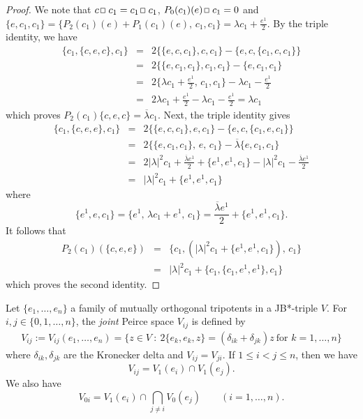\documentclass[12pt, twoside]{article}
\def\sqr#1#2{{\,\vcenter{\vbox{\hrule height.#2pt\hbox{\vrule width.#2pt
height#1pt \kern#1pt\vrule width.#2pt}\hrule height.#2pt}}\,}}
\def\bo{\sqr44\,}
\theoremstyle{definition}
\numberwithin{equation}{section}
\begin{document}
\begin{proof}
We note that $c\bo c_1 =  c_1\bo c_1$, $P_0(c_1)(e) \bo c_1 =0$  and
$\{e,c_1,c_1\}=\{ P_2(c_1)(e) + P_1(c_1)(e),\, c_1,c_1\} = \lambda c_1 + \frac{e^1}{2}$.
 By the triple identity, we have
\begin{eqnarray*}
\{c_1, \{c,e,c\}, c_1\}&=& 2\{\{e,c,c_1\}, c,c_1\} - \{e,c, \{c_1,c, c_1\}\}\\
&=& 2 \{\{e,c_1,c_1\}, c_1,c_1\} -  \{e,c_1,c_1\}\\
&=& 2\{ \lambda c_1 + \frac{e^1}{2},\,  c_1,c_1\} -  \lambda c_1 - \frac{ e^1}{2}\\
&=&  2 \lambda c_1 + \frac{ e^1}{2}-  \lambda c_1 - \frac{ e^1}{2} = \lambda c_1
\end{eqnarray*}
which proves $P_2(c_1)\{c,e,c\} = \overline\lambda  c_1$.
Next, the triple identity gives
\begin{eqnarray*}
\{c_1, \{c,e,e\}, c_1\}&=& 2\{\{e,c,c_1\}, e,c_1\} - \{e,c, \{c_1,e, c_1\}\}\\
&=&  2 \{\{e,c_1,c_1\},\, e, \,c_1\} -  \overline \lambda \{e, c_1, c_1\}\\
&=& 2 |\lambda|^2c_1 + \frac{\overline\lambda e^1}{2} + \{e^1,e^1,c_1\}
 -  |\lambda|^2 c_1 -\frac{ \overline\lambda e^1}{2}\\
&=& |\lambda|^2c_1 +  \{e^1,e^1,c_1\}
\end{eqnarray*}
where
$$\{e^1,e,c_1\}= \{e^1,\, \lambda c_1 + e^1,\, c_1\}= \frac{\overline\lambda e^1}{2} + \{e^1,e^1,c_1\}.$$
It follows  that
\begin{eqnarray*}
P_2(c_1)( \{c, e,e\}) &=& \{c_1, (  |\lambda|^2c_1 +  \{e^1,e^1,c_1\} ),\, c_1\}\\
&=&  |\lambda|^2  c_1 +  \{c_1,\{c_1, e^1,e^1\}, c_1\}
\end{eqnarray*}
which proves the second identity.

\end{proof}

 Let $\{e_{1},\dots,e_{n}\}$ a family  of mutually orthogonal tripotents in a JB*-triple $V$. For $i,j \in \{0,1, \ldots,n\}$,
 the {\it joint} Peirce space $V_{ij}$ is defined by
\begin{eqnarray*}\label{ij}
V_{ij}:=  V_{ij}(e_{1},\dots,e_{n})  =\{z\in V\medspace:\medspace2\{e_{k},e_{k},z\}=(\delta_{ik}+\delta_{jk})z\medspace\text{for }k=1,\dots,n\}
\end{eqnarray*}
where $\delta_{ik}, \delta_{jk}$ are the Kronecker delta and $V_{ij}=V_{ji}$. If $1\leq i < j\leq n$, then we have
\begin{equation}\label{vij}
V_{ij} = V_1(e_i) \cap V_1(e_j).
\end{equation}
We also have
\begin{equation}\label{io}
V_{0i}=V_1(e_i) \cap \bigcap_{j\neq i} V_0(e_j) \qquad (i=1, \ldots, n).
\end{equation}
\end{document}

